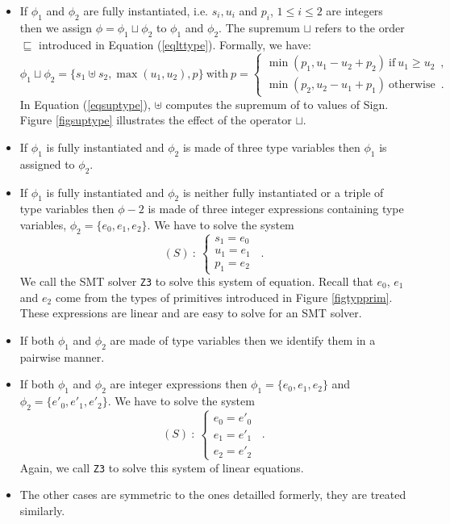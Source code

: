 \begin{itemize}
\item If $\phi_1$ and $\phi_2$ are fully instantiated, i.e.  $s_i,u_i$ and $p_i$, $1\le i\le 2$
are integers then we assign $\phi=\phi_1 \sqcup\phi_2$ to $\phi_1$ and $\phi_2$.
The supremum $\sqcup$ refers to the order $\sqsubseteq$ introduced in  Equation (\ref{eqlttype}).
Formally, we have:
\begin{equation}\label{eqsuptype}
\phi_1\sqcup\phi_2=\big\{ s_1 \uplus s_2,\max(u_1,u_2),p\big\}\ \text{with}\ p=\left\{
\begin{array}{l}
\min(p_1,u_1-u_2+p_2)\ \text{if}\ u_1\ge u_2\enspace ,\\
\min(p_2,u_2-u_1+p_1)\ \text{otherwise}\enspace .
\end{array}\right.
\end{equation}
In Equation (\ref{eqsuptype}), $\uplus$ computes the supremum of to values of \textsf{Sign}.
Figure \ref{figsuptype} illustrates the effect of the operator $\sqcup$.
\item If $\phi_1$ is fully instantiated and $\phi_2$ is made of three type variables then $\phi_1$
is assigned to $\phi_2$.
\item If $\phi_1$ is fully instantiated and $\phi_2$ is neither fully instantiated or a triple
of type variables then $\phi-2$ is made of three integer expressions containing type variables,
$\phi_2=\{e_0,e_1,e_2\}$. We have to solve the system 
\begin{equation}
(S)\ : \ \left\{
\begin{array}{l}
s_1 = e_0\\
u_1 = e_1\\
p_1 = e_2
\end{array}\right.\enspace .
\end{equation}
We call the SMT solver \texttt{Z3} to solve this system of equation. Recall that $e_0$, $e_1$ and
$e_2$ come from the types of primitives introduced in Figure \ref{figtypprim}. These expressions
are linear and are easy to solve for an SMT solver.
\item If both $\phi_1$ and $\phi_2$ are made of type variables then we identify them in a pairwise
manner.
\item If both $\phi_1$ and $\phi_2$ are integer expressions then 
$\phi_1=\{e_0,e_1,e_2\}$ and $\phi_2=\{e'_0,e'_1,e'_2\}$. We have to solve the system 
\begin{equation}
(S)\ : \ \left\{
\begin{array}{l}
e_0 = e'_0\\
e_1 = e'_1\\
e_2 = e'_2
\end{array}\right.\enspace .
\end{equation}
Again, we call \texttt{Z3} to solve this system of linear equations.
\item The other cases are symmetric to the ones detailled formerly, they are treated similarly.
\end{itemize}


